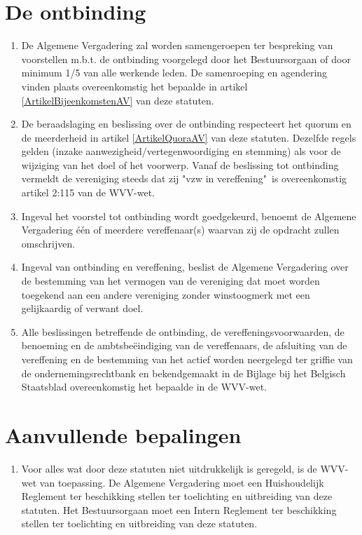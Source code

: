     \section{De ontbinding}
    \label{ArtikelOntbinding}
    \begin{enumerate}
    \item De Algemene Vergadering zal worden samengeroepen ter bespreking van voorstellen m.b.t. de ontbinding voorgelegd door het Bestuursorgaan of door minimum 1/5 van alle werkende leden. De samenroeping en agendering vinden plaats overeenkomstig het bepaalde in artikel \ref{ArtikelBijeenkomstenAV} van deze statuten.
    \item De beraadslaging en beslissing over de ontbinding respecteert het quorum en de meerderheid in artikel \ref{ArtikelQuoraAV} van deze statuten. Dezelfde regels gelden (inzake aanwezigheid/vertegenwoordiging en stemming) als voor de wijziging van het doel of het voorwerp. Vanaf de beslissing tot ontbinding vermeldt de vereniging steeds dat zij "vzw in vereffening"\ is overeenkomstig artikel 2:115 van de WVV-wet.
    \item Ingeval het voorstel tot ontbinding wordt goedgekeurd, benoemt de Algemene Vergadering één of meerdere vereffenaar(s) waarvan zij de opdracht zullen omschrijven.
    \item Ingeval van ontbinding en vereffening, beslist de Algemene Vergadering over de bestemming van het vermogen van de vereniging dat moet worden toegekend aan een andere vereniging zonder winstoogmerk met een gelijkaardig of verwant doel.
    \item Alle beslissingen betreffende de ontbinding, de vereffeningsvoorwaarden, de benoeming en de ambtsbeëindiging van de vereffenaars, de afsluiting van de vereffening en de bestemming van het actief worden neergelegd ter griffie van de ondernemingsrechtbank en bekendgemaakt in de Bijlage bij het Belgisch Staatsblad overeenkomstig het bepaalde in de WVV-wet.
    \end{enumerate}
    
    \section{Aanvullende bepalingen}
    \begin{enumerate}
    \item Voor alles wat door deze statuten niet uitdrukkelijk is geregeld, is de WVV-wet van toepassing. De Algemene Vergadering moet een Huishoudelijk Reglement ter beschikking stellen ter toelichting en uitbreiding van deze statuten. Het Bestuursorgaan moet een Intern Reglement ter beschikking stellen ter toelichting en uitbreiding van deze statuten.
    \end{enumerate}
    
